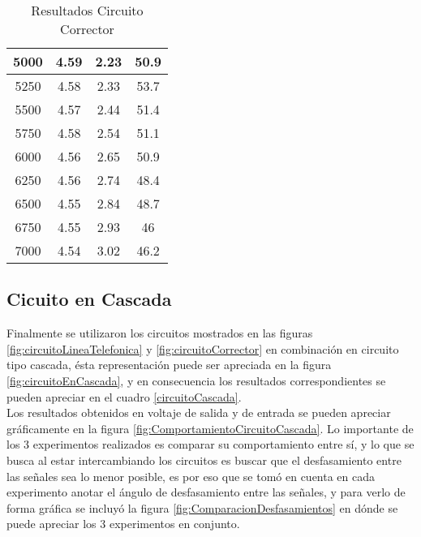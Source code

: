 \documentclass{article}
\begin{document}
\begin{table}[h!]
\begin{tabular}{|c|c|c|c|}
5000                & 4.59          & 2.23         & 50.9          \\ \hline
5250                & 4.58          & 2.33         & 53.7          \\ \hline
5500                & 4.57          & 2.44         & 51.4          \\ \hline
5750                & 4.58          & 2.54         & 51.1          \\ \hline
6000                & 4.56          & 2.65         & 50.9          \\ \hline
6250                & 4.56          & 2.74         & 48.4          \\ \hline
6500                & 4.55          & 2.84         & 48.7          \\ \hline
6750                & 4.55          & 2.93         & 46            \\ \hline
7000                & 4.54          & 3.02         & 46.2          \\ \hline
\end{tabular}

\caption{Resultados Circuito Corrector}
\label{circuitoCorrector}

\end{table}


\subsection{Cicuito en Cascada}

Finalmente se utilizaron los circuitos mostrados en las figuras \ref{fig:circuitoLineaTelefonica} y \ref{fig:circuitoCorrector} en combinación en circuito tipo cascada, ésta representación puede ser apreciada en la figura \ref{fig:circuitoEnCascada}, y en consecuencia los resultados correspondientes se pueden apreciar en el cuadro \ref{circuitoCascada}.\\

Los resultados obtenidos en voltaje de salida y de entrada se pueden apreciar gráficamente en la figura \ref{fig:ComportamientoCircuitoCascada}. Lo importante de los 3 experimentos realizados es comparar su comportamiento entre sí, y lo que se busca al estar intercambiando los circuitos es buscar que el desfasamiento entre las señales sea lo menor posible, es por eso que se tomó en cuenta en cada experimento anotar el ángulo de desfasamiento entre las señales, y para verlo de forma gráfica se incluyó la figura \ref{fig:ComparacionDesfasamientos} en dónde se puede apreciar los 3 experimentos en conjunto.
\end{document}
